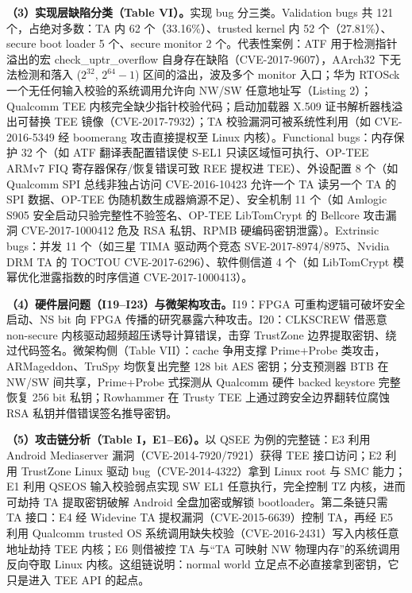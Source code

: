 \documentclass[11pt]{ctexart}
\begin{document}
\noindent\textbf{（3）实现层缺陷分类（Table VI）。}实现 bug 分三类。Validation bugs 共 121 个，占绝对多数：TA 内 62 个（33.16\%）、trusted kernel 内 52 个（27.81\%）、secure boot loader 5 个、secure monitor 2 个。代表性案例：ATF 用于检测指针溢出的宏 check\_uptr\_overflow 自身存在缺陷（CVE-2017-9607），AArch32 下无法检测和落入 ($2^{32}$, $2^{64}-1$) 区间的溢出，波及多个 monitor 入口；华为 RTOSck 一个无任何输入校验的系统调用允许向 NW/SW 任意地址写（Listing 2）；Qualcomm TEE 内核完全缺少指针校验代码；启动加载器 X.509 证书解析器栈溢出可替换 TEE 镜像（CVE-2017-7932）；TA 校验漏洞可被系统性利用（如 CVE-2016-5349 经 boomerang 攻击直接提权至 Linux 内核）。Functional bugs：内存保护 32 个（如 ATF 翻译表配置错误使 S-EL1 只读区域恒可执行、OP-TEE ARMv7 FIQ 寄存器保存/恢复错误可致 REE 提权进 TEE）、外设配置 8 个（如 Qualcomm SPI 总线非独占访问 CVE-2016-10423 允许一个 TA 读另一个 TA 的 SPI 数据、OP-TEE 伪随机数生成器熵源不足）、安全机制 11 个（如 Amlogic S905 安全启动只验完整性不验签名、OP-TEE LibTomCrypt 的 Bellcore 攻击漏洞 CVE-2017-1000412 危及 RSA 私钥、RPMB 硬编码密钥泄露）。Extrinsic bugs：并发 11 个（如三星 TIMA 驱动两个竞态 SVE-2017-8974/8975、Nvidia DRM TA 的 TOCTOU CVE-2017-6296）、软件侧信道 4 个（如 LibTomCrypt 模幂优化泄露指数的时序信道 CVE-2017-1000413）。\par
\noindent\textbf{（4）硬件层问题（I19--I23）与微架构攻击。}I19：FPGA 可重构逻辑可破坏安全启动、NS bit 向 FPGA 传播的研究暴露六种攻击。I20：CLKSCREW 借恶意 non-secure 内核驱动超频超压诱导计算错误，击穿 TrustZone 边界提取密钥、绕过代码签名。微架构侧（Table VII）：cache 争用支撑 Prime+Probe 类攻击，ARMageddon、TruSpy 均恢复出完整 128 bit AES 密钥；分支预测器 BTB 在 NW/SW 间共享，Prime+Probe 式探测从 Qualcomm 硬件 backed keystore 完整恢复 256 bit 私钥；Rowhammer 在 Trusty TEE 上通过跨安全边界翻转位腐蚀 RSA 私钥并借错误签名推导密钥。\par
\noindent\textbf{（5）攻击链分析（Table I，E1--E6）。}以 QSEE 为例的完整链：E3 利用 Android Mediaserver 漏洞（CVE-2014-7920/7921）获得 TEE 接口访问；E2 利用 TrustZone Linux 驱动 bug（CVE-2014-4322）拿到 Linux root 与 SMC 能力；E1 利用 QSEOS 输入校验弱点实现 SW EL1 任意执行，完全控制 TZ 内核，进而可劫持 TA 提取密钥破解 Android 全盘加密或解锁 bootloader。第二条链只需 TA 接口：E4 经 Widevine TA 提权漏洞（CVE-2015-6639）控制 TA，再经 E5 利用 Qualcomm trusted OS 系统调用缺失校验（CVE-2016-2431）写入内核任意地址劫持 TEE 内核；E6 则借被控 TA 与``TA 可映射 NW 物理内存''的系统调用反向夺取 Linux 内核。这组链说明：normal world 立足点不必直接拿到密钥，它只是进入 TEE API 的起点。\par
\end{document}

